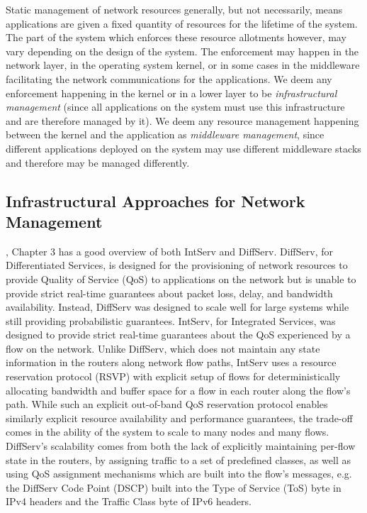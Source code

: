 Static management of network resources generally, but not necessarily,
means applications are given a fixed quantity of resources for the
lifetime of the system.  The part of the system which enforces these
resource allotments however, may vary depending on the design of the
system.  The enforcement may happen in the network layer, in the
operating system kernel, or in some cases in the middleware
facilitating the network communications for the applications.  We deem
any enforcement happening in the kernel or in a lower layer to be
\textit{infrastructural management} (since all applications on the
system must use this infrastructure and are therefore managed by it).
We deem any resource management happening between the kernel and the
application as \textit{middleware management}, since different
applications deployed on the system may use different middleware
stacks and therefore may be managed differently.


\subsection{Infrastructural Approaches for Network Management}
\label{subsec:related_part2_infrastructural}

\cite{QT_Giambene2005}, Chapter 3 has a good overview of both IntServ
and DiffServ.  DiffServ, for Differentiated Services, is designed for
the provisioning of network resources to provide Quality of Service
(QoS) to applications on the network but is unable to provide strict
real-time guarantees about packet loss, delay, and bandwidth
availability.  Instead, DiffServ was designed to scale well for large
systems while still providing probabilistic guarantees.  IntServ, for
Integrated Services, was designed to provide strict real-time
guarantees about the QoS experienced by a flow on the network.  Unlike
DiffServ, which does not maintain any state information in the routers
along network flow paths, IntServ uses a resource reservation protocol
(RSVP) with explicit setup of flows for deterministically allocating
bandwidth and buffer space for a flow in each router along the flow's
path.  While such an explicit out-of-band QoS reservation protocol
enables similarly explicit resource availability and performance
guarantees, the trade-off comes in the ability of the system to scale
to many nodes and many flows.  DiffServ's scalability comes from both
the lack of explicitly maintaining per-flow state in the routers, by
assigning traffic to a set of predefined classes, as well as using QoS
assignment mechanisms which are built into the flow's messages,
e.g. the DiffServ Code Point (DSCP) built into the Type of Service
(ToS) byte in IPv4 headers and the Traffic Class byte of IPv6 headers.

